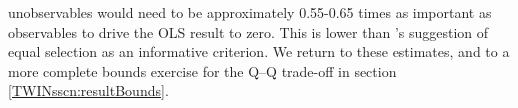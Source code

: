 \documentclass[subeqn]{article}
\begin{document}
\begin{spacing}{1.4}
unobservables would need to be
approximately 0.55-0.65 times as important as observables to drive the OLS
result to zero. This is lower than \citeauthor{Oster2013}'s suggestion of equal
selection as an informative criterion.  
We return to these estimates, and to a more complete bounds exercise for the Q--Q trade-off in section \ref{TWINsscn:resultBounds}.


\end{spacing}
\end{document}

